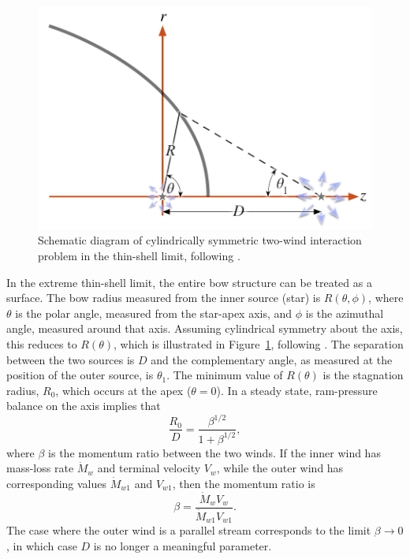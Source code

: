 \begin{figure}
  \centering
  \includegraphics[width=\linewidth]{figs/bowshock-crw-variables}
  \caption[]{Schematic diagram of cylindrically symmetric two-wind
    interaction problem in the thin-shell limit, following
    \citet{Canto:1996}.}
  \label{fig:crw-schema}
\end{figure}
In the extreme thin-shell limit, the entire bow structure can be
treated as a surface.  The bow radius measured from the inner source
(star) is \(R(\theta, \phi)\), where \(\theta\) is the polar angle, measured from
the star-apex axis, and \(\phi\) is the azimuthal angle, measured around
that axis.  Assuming cylindrical symmetry about the axis, this reduces
to \(R(\theta)\), which is illustrated in Figure~\ref{fig:crw-schema},
following \citet{Canto:1996}.  The separation between the two sources
is \(D\) and the complementary angle, as measured at the position of
the outer source, is \(\theta_1\).  The minimum value of \(R(\theta)\) is the
stagnation radius, \(R_0\), which occurs at the apex (\(\theta = 0\)).  In
a steady state, ram-pressure balance on the axis implies that
\begin{equation}
  \label{eq:stagnation-radius}
  \frac{R_0} {D} = \frac{\beta^{1/2}} {1 + \beta^{1/2}} ,
\end{equation}
where \(\beta\) is the momentum ratio between the two winds.  If the inner
wind has mass-loss rate \(\dot{M}_w\) and terminal velocity \(V_w\),
while the outer wind has corresponding values \(\dot{M}_{w1}\) and
\(V_{w1}\), then the momentum ratio is
\begin{equation}
  \label{eq:beta-definition}
  \beta = \frac{\dot{M}_w V_w} {\dot{M}_{w1} V_{w1}} .
\end{equation}
The case where the outer wind is a parallel stream
\citep{Wilkin:1996a} corresponds to the limit \(\beta \to 0\), in which case
\(D\) is no longer a meaningful parameter.

